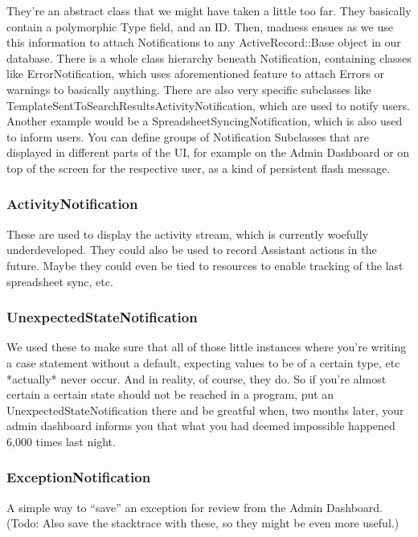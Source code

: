 They’re an abstract class that we might have taken a little too far. They basically contain a polymorphic Type field, and an ID. Then, madness ensues as we use this information to attach Notifications to any ActiveRecord::Base object in our database. There is a whole class hierarchy beneath Notification, containing classes like ErrorNotification, which uses aforementioned feature to attach Errors or warnings to basically anything. There are also very specific subclasses like TemplateSentToSearchResultsActivityNotification, which are used to notify users. Another example would be a SpreadsheetSyncingNotification, which is also used to inform users. You can define groups of Notification Subclasses that are displayed in different parts of the UI, for example on the Admin Dashboard or on top of the screen for the respective user, as a kind of persistent flash message.

\subsubsection{ActivityNotification}

These are used to display the activity stream, which is currently woefully underdeveloped.
They could also be used to record Assistant actions in the future. Maybe they could even be tied to resources to enable tracking of the last spreadsheet sync, etc.

\subsubsection{UnexpectedStateNotification}

We used these to make sure that all of those little instances where you’re writing a case statement without a default, expecting values to be of a certain type, etc *actually* never occur. And in reality, of course, they do. So if you’re almost certain a certain state should not be reached in a program, put an UnexpectedStateNotification there and be greatful when, two months later, your admin dashboard informs you that what you had deemed impossible happened 6,000 times last night.

\subsubsection{ExceptionNotification}

A simple way to “save” an exception for review from the Admin Dashboard. (Todo: Also save the stacktrace with these, so they might be even more useful.)

